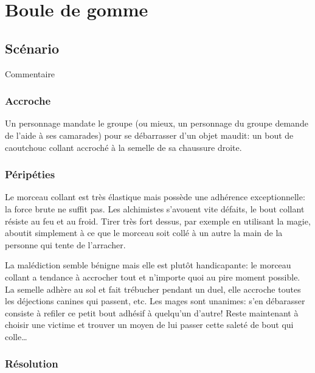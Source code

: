 \chapter{Boule de gomme}

\section{Scénario}

Commentaire

\subsection{Accroche}

Un personnage mandate le groupe (ou mieux, un personnage du groupe demande de l'aide à ses camarades) pour se débarrasser d'un objet maudit: un bout de caoutchouc collant accroché à la semelle de sa chaussure droite.

\subsection{Péripéties}

Le morceau collant est très élastique mais possède une adhérence exceptionnelle: la force brute ne suffit pas.
Les alchimistes s'avouent vite défaits, le bout collant résiste au feu et au froid.
Tirer très fort dessus, par exemple en utilisant la magie, aboutit simplement à ce que le morceau soit collé à un autre la main de la personne qui tente de l'arracher.

La malédiction semble bénigne mais elle est plutôt handicapante: le morceau collant a tendance à accrocher tout et n'importe quoi au pire moment possible.
La semelle adhère au sol et fait trébucher pendant un duel, elle accroche toutes les déjections canines qui passent, etc.
Les mages sont unanimes: s'en débarasser consiste à refiler ce petit bout adhésif à quelqu'un d'autre!
Reste maintenant à choisir une victime et trouver un moyen de lui passer cette saleté de bout qui colle\dots


\subsection{Résolution}
